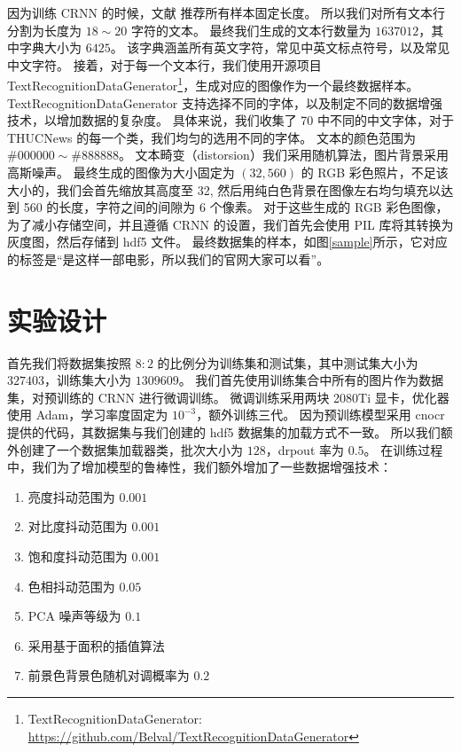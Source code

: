 因为训练 CRNN 的时候，文献\cite{CRNN} 推荐所有样本固定长度。
所以我们对所有文本行分割为长度为 $18 \sim 20$ 字符的文本。
最终我们生成的文本行数量为 $1637012$，其中字典大小为 $6425$。
该字典涵盖所有英文字符，常见中英文标点符号，以及常见中文字符。
接着，对于每一个文本行，我们使用开源项目 TextRecognitionDataGenerator\footnote{TextRecognitionDataGenerator: \url{https://github.com/Belval/TextRecognitionDataGenerator}}，生成对应的图像作为一个最终数据样本。
TextRecognitionDataGenerator 支持选择不同的字体，以及制定不同的数据增强技术，以增加数据的复杂度。
具体来说，我们收集了 70 中不同的中文字体，对于 THUCNews 的每一个类，我们均匀的选用不同的字体。
文本的颜色范围为 $\#000000 \sim \#888888$。
文本畸变（distorsion）我们采用随机算法，图片背景采用高斯噪声。
最终生成的图像为大小固定为 $(32, 560)$ 的 RGB 彩色照片，不足该大小的，我们会首先缩放其高度至 32, 然后用纯白色背景在图像左右均匀填充以达到 560 的长度，字符之间的间隙为 6 个像素。
对于这些生成的 RGB 彩色图像，为了减小存储空间，并且遵循 CRNN\cite{CRNN} 的设置，我们首先会使用 PIL 库将其转换为灰度图，然后存储到 hdf5 文件。
最终数据集的样本，如图\ref{sample}所示，它对应的标签是“是这样一部电影，所以我们的官网大家可以看”。

\section{实验设计}
\label{exp_design}
首先我们将数据集按照 $8:2$ 的比例分为训练集和测试集，其中测试集大小为 $327403$，训练集大小为 $1309609$。
我们首先使用训练集合中所有的图片作为数据集，对预训练的 CRNN 进行微调训练。
微调训练采用两块 2080Ti 显卡，优化器使用 Adam，学习率度固定为 $10^{-3}$，额外训练三代。
因为预训练模型采用 cnocr 提供的代码，其数据集与我们创建的 hdf5 数据集的加载方式不一致。
所以我们额外创建了一个数据集加载器类，批次大小为 $128$，drpout 率为 $0.5$。
在训练过程中，我们为了增加模型的鲁棒性，我们额外增加了一些数据增强技术：

\begin{enumerate}[(1)]
	\item 亮度抖动范围为 $0.001$
	\item 对比度抖动范围为 $0.001$
	\item 饱和度抖动范围为 $0.001$
	\item 色相抖动范围为 $0.05$
	\item PCA 噪声等级为 $0.1$
	\item 采用基于面积的插值算法
	\item 前景色背景色随机对调概率为 $0.2$
\end{enumerate}

